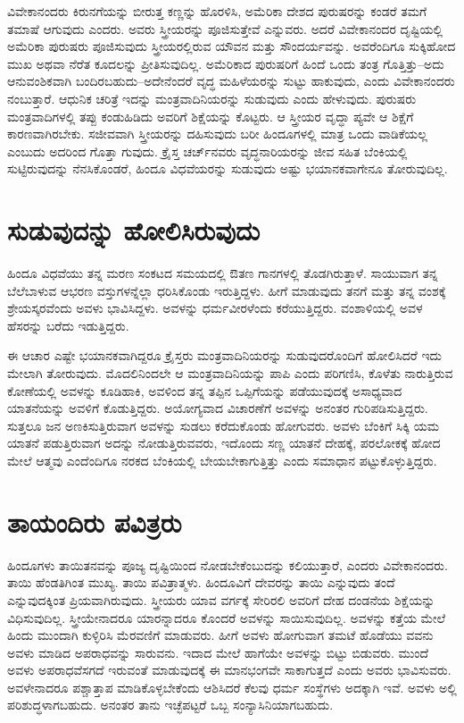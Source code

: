 ವಿವೇಕಾನಂದರು ಕಿರುನಗೆಯನ್ನು ಬೀರುತ್ತ ಕಣ್ಣನ್ನು ಹೊರಳಿಸಿ, ಅಮೆರಿಕಾ ದೇಶದ ಪುರುಷರನ್ನು ಕಂಡರೆ ತಮಗೆ ತಮಾಷೆ ಆಗುವುದು ಎಂದರು. ಅವರು ಸ್ತ್ರೀಯರನ್ನು ಪೂಜಿಸುತ್ತೇವೆ ಎನ್ನುವರು. ಅದರೆ ವಿವೇಕಾನಂದರ ದೃಷ್ಟಿಯಲ್ಲಿ ಅಮೆರಿಕಾ ಪುರುಷರು ಪೂಜಿಸುವುದು ಸ್ತ್ರೀಯರಲ್ಲಿರುವ ಯೌವನ ಮತ್ತು ಸೌಂದರ್ಯವನ್ನು. ಅವರೆಂದಿಗೂ ಸುಕ್ಕಿಹೋದ ಮುಖ ಅಥವಾ ನೆರೆತ ಕೂದಲನ್ನು ಪ್ರೀತಿಸುವುದಿಲ್ಲ. ಅಮೆರಿಕಾದ ಪುರುಷರಿಗೆ ಹಿಂದೆ ಒಂದು ತಂತ್ರ ಗೊತ್ತಿತ್ತು–ಅದು ಆನುವಂಶಿಕವಾಗಿ ಬಂದಿರಬಹುದು–ಅದೇನೆಂದರೆ ವೃದ್ಧ ಮಹಿಳೆಯರನ್ನು ಸುಟ್ಟು ಹಾಕುವುದು, ಎಂದು ವಿವೇಕಾನಂದರು ನಂಬುತ್ತಾರೆ. ಆಧುನಿಕ ಚರಿತ್ರೆ ಇದನ್ನು ಮಂತ್ರವಾದಿನಿಯರನ್ನು ಸುಡುವುದು ಎಂದು ಹೇಳುವುದು. ಪುರುಷರು ಮಂತ್ರವಾದಿಗಳಲ್ಲಿ ತಪ್ಪು ಕಂಡುಹಿಡಿದು ಅವರಿಗೆ ಶಿಕ್ಷೆಯನ್ನು ಕೊಟ್ಟರು. ಆ ಸ್ತ್ರೀಯರ ವೃದ್ಧಾ ಪ್ಯವೇ ಆ ಶಿಕ್ಷೆಗೆ ಕಾರಣವಾಗಿರಬೇಕು. ಸಜೀವವಾಗಿ ಸ್ತ್ರೀಯರನ್ನು ದಹಿಸುವುದು ಬರೀ ಹಿಂದೂಗಳಲ್ಲಿ ಮಾತ್ರ ಒಂದು ವಾಡಿಕೆಯಲ್ಲ ಎಂಬುದು ಅದರಿಂದ ಗೊತ್ತಾ ಗುವುದು. ಕ್ರೈಸ್ತ ಚರ್ಚ್​ನವರು ವೃದ್ಧನಾರಿಯರನ್ನು ಜೀವ ಸಹಿತ ಬೆಂಕಿಯಲ್ಲಿ ಸುಟ್ಟಿರುವುದನ್ನು ನೆನಸಿಕೊಂಡರೆ, ಹಿಂದೂ ವಿಧವೆಯರನ್ನು ಸುಡುವುದು ಅಷ್ಟು ಭಯಾನಕವಾಗೇನೂ ತೋರುವುದಿಲ್ಲ.


\section{ಸುಡುವುದನ್ನು ಹೋಲಿಸಿರುವುದು}

ಹಿಂದೂ ವಿಧವೆಯು ತನ್ನ ಮರಣ ಸಂಕಟದ ಸಮಯದಲ್ಲಿ ಔತಣ ಗಾನಗಳಲ್ಲಿ ತೊಡಗಿರುತ್ತಾಳೆ. ಸಾಯುವಾಗ ತನ್ನ ಬೆಲೆಬಾಳುವ ಆಭರಣ ವಸ್ತುಗಳನ್ನೆಲ್ಲಾ ಧರಿಸಿಕೊಂಡು ಇರುತ್ತಿದ್ದಳು. ಹೀಗೆ ಮಾಡುವುದು ತನಗೆ ಮತ್ತು ತನ್ನ ವಂಶಕ್ಕೆ ಶ್ರೇಯಸ್ಕರವೆಂದು ಅವಳು ಭಾವಿಸಿದ್ದಳು. ಅವಳನ್ನು ಧರ್ಮವೀರಳೆಂದು ಕರೆಯುತ್ತಿದ್ದರು. ವಂಶಾಳಿಯಲ್ಲಿ ಅವಳ ಹೆಸರನ್ನು ಬರೆದು ಇಡುತ್ತಿದ್ದರು.

ಈ ಆಚಾರ ಎಷ್ಟೇ ಭಯಾನಕವಾಗಿದ್ದರೂ ಕ್ರೈಸ್ತರು ಮಂತ್ರವಾದಿನಿಯರನ್ನು ಸುಡುವುದರೊಂದಿಗೆ ಹೋಲಿಸಿದರೆ ಇದು ಮೇಲಾಗಿ ತೋರುವುದು. ಮೊದಲಿನಿಂದಲೇ ಆ ಮಂತ್ರವಾದಿನಿಯನ್ನು ಪಾಪಿ ಎಂದು ಪರಿಗಣಿಸಿ, ಕೊಳೆತು ನಾರುತ್ತಿರುವ ಕೋಣೆಯಲ್ಲಿ ಅವಳನ್ನು ಕೂಡಿಹಾಕಿ, ಅವಳಿಂದ ತನ್ನ ತಪ್ಪಿನ ಒಪ್ಪಿಗೆಯನ್ನು ಪಡೆಯುವುದಕ್ಕೆ ಅಸಾಧ್ಯವಾದ ಯಾತನೆಯನ್ನು ಅವಳಿಗೆ ಕೊಡುತ್ತಿದ್ದರು. ಅಯೋಗ್ಯವಾದ ವಿಚಾರಣೆಗೆ ಅವಳನ್ನು ಅನಂತರ ಗುರಿಪಡಿಸುತ್ತಿದ್ದರು. ಸುತ್ತಲೂ ಜನ ಅಣಕಿಸುತ್ತಿರುವಾಗ ಅವಳನ್ನು ಸುಡಲು ಕರೆದುಕೊಂಡು ಹೋಗುವರು. ಅವಳು ಬೆಂಕಿಗೆ ಸಿಕ್ಕಿ ಯಮ ಯಾತನೆ ಪಡುತ್ತಿರುವಾಗ ಅದನ್ನು ನೋಡುತ್ತಿರುವವರು, ಇದೊಂದು ಸಣ್ಣ ಯಾತನೆ ದೇಹಕ್ಕೆ, ಪರಲೋಕಕ್ಕೆ ಹೋದ ಮೇಲೆ ಆತ್ಮವು ಎಂದೆಂದಿಗೂ ನರಕದ ಬೆಂಕಿಯಲ್ಲಿ ಬೇಯಬೇಕಾಗುತ್ತಿತ್ತು ಎಂದು ಸಮಾಧಾನ ಪಟ್ಟುಕೊಳ್ಳುತ್ತಿದ್ದರು.

\delimiter


\section{ತಾಯಂದಿರು ಪವಿತ್ರರು}

ಹಿಂದೂಗಳು ತಾಯಿತನವನ್ನು ಪೂಜ್ಯ ದೃಷ್ಟಿಯಿಂದ ನೋಡಬೇಕೆಂಬುದನ್ನು ಕಲಿಯುತ್ತಾರೆ, ಎಂದರು ವಿವೇಕಾನಂದರು. ತಾಯಿ ಹೆಂಡತಿಗಿಂತ ಮುಖ್ಯ. ತಾಯಿ ಪವಿತ್ರಾತ್ಮಳು. ಹಿಂದೂವಿಗೆ ದೇವರನ್ನು ತಾಯಿ ಎನ್ನುವುದು ತಂದೆ ಎನ್ನುವುದಕ್ಕಿಂತ ಪ್ರಿಯವಾಗಿರುವುದು. ಸ್ತ್ರೀಯರು ಯಾವ ವರ್ಗಕ್ಕೆ ಸೇರಿರಲಿ ಅವರಿಗೆ ದೇಹ ದಂಡನೆಯ ಶಿಕ್ಷೆಯನ್ನು ವಿಧಿಸುವುದಿಲ್ಲ. ಸ್ತ್ರೀಯೇನಾದರೂ ಯಾರನ್ನಾದರೂ ಕೊಂದರೆ ಅವಳನ್ನು ಸಾಯಿಸುವುದಿಲ್ಲ. ಅವಳನ್ನು ಕತ್ತೆಯ ಮೇಲೆ ಹಿಂದು ಮುಂದಾಗಿ ಕುಳ್ಳಿರಿಸಿ ಮೆರವಣಿಗೆ ಮಾಡುವರು. ಹೀಗೆ ಅವಳು ಹೋಗುವಾಗ ತಮಟೆ ಹೊಡೆಯು ವವನು ಅವಳು ಮಾಡಿದ ಅಪರಾಧವನ್ನು ಸಾರುವನು. ಇದಾದ ಮೇಲೆ ಹಾಗೆಯೇ ಅವಳನ್ನು ಬಿಟ್ಟು ಬಿಡುವರು. ಮುಂದೆ ಅವಳು ಅಪರಾಧವೆಸಗದೆ ಇರುವಂತೆ ಮಾಡುವುದಕ್ಕೆ ಈ ಮಾನಭಂಗವೇ ಸಾಕಾಗುತ್ತದೆ ಎಂದು ಅವರು ಭಾವಿಸುವರು. ಅವಳೇನಾದರೂ ಪಶ್ಚಾತ್ತಾಪ ಮಾಡಿಕೊಳ್ಳಬೇಕೆಂದು ಆಶಿಸಿದರೆ ಕೆಲವು ಧರ್ಮ ಸಂಸ್ಥೆಗಳು ಅದಕ್ಕಾಗಿ ಇವೆ. ಅವಳು ಅಲ್ಲಿ ಪರಿಶುದ್ಧಳಾಗಬಹುದು. ಅನಂತರ ತಾನು ಇಚ್ಛೆಪಟ್ಟರೆ ಒಬ್ಬ ಸಂನ್ಯಾಸಿನಿಯಾಗಬಹುದು.

